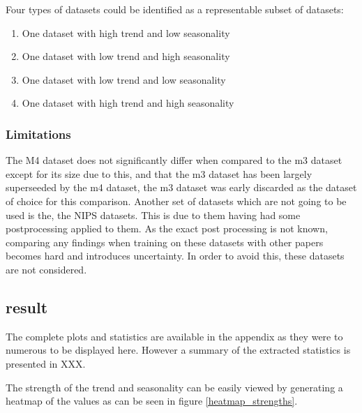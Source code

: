 Four types of datasets could be identified as a representable subset of datasets:

\begin{enumerate}
  \item One dataset with high trend and low seasonality
  \item One dataset with low trend and high seasonality
  \item One dataset with low trend and low seasonality
  \item One dataset with high trend and high seasonality
\end{enumerate}
\label{dataset_criteria}

\subsubsection{Limitations}
The M4 dataset does not significantly differ when compared to the m3 dataset except for its size \cite{m3_vs_m4} due to this, and that the m3 dataset has been largely superseeded by the m4 dataset, the m3 dataset was early discarded as the dataset of choice for this comparison.
Another set of datasets which are not going to be used is the, the NIPS datasets. This is due to them having had some postprocessing applied to them. As the exact post processing is not known, comparing any findings when training on these datasets with other papers becomes hard and introduces uncertainty. In order to avoid this, these datasets are not considered.

\subsection{result}
The complete plots and statistics are available in the appendix as they were to numerous to be displayed here. However a summary of the extracted statistics is presented in XXX.

The strength of the trend and seasonality can be easily viewed by generating a heatmap of the values as can be seen in figure \ref{heatmap_strengths}.

